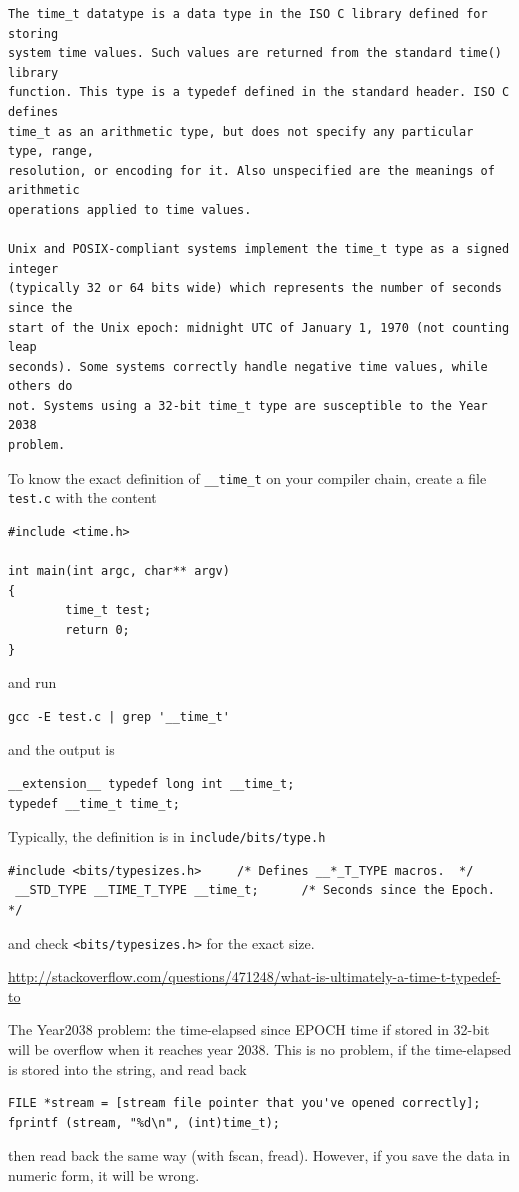 \begin{verbatim}
The time_t datatype is a data type in the ISO C library defined for storing
system time values. Such values are returned from the standard time() library
function. This type is a typedef defined in the standard header. ISO C defines
time_t as an arithmetic type, but does not specify any particular type, range,
resolution, or encoding for it. Also unspecified are the meanings of arithmetic
operations applied to time values.

Unix and POSIX-compliant systems implement the time_t type as a signed integer
(typically 32 or 64 bits wide) which represents the number of seconds since the
start of the Unix epoch: midnight UTC of January 1, 1970 (not counting leap
seconds). Some systems correctly handle negative time values, while others do
not. Systems using a 32-bit time_t type are susceptible to the Year 2038
problem. 
\end{verbatim}
 To know the exact definition of \verb!__time_t! on your compiler chain, create
 a file \verb!test.c! with the content
\begin{verbatim}
#include <time.h>

int main(int argc, char** argv)
{
        time_t test;
        return 0;
}
\end{verbatim}
and run
\begin{verbatim}
gcc -E test.c | grep '__time_t'
\end{verbatim}
and the output is
\begin{verbatim}
__extension__ typedef long int __time_t;
typedef __time_t time_t;

\end{verbatim}
Typically, the definition is in \verb!include/bits/type.h!
\begin{verbatim}
#include <bits/typesizes.h>     /* Defines __*_T_TYPE macros.  */
 __STD_TYPE __TIME_T_TYPE __time_t;      /* Seconds since the Epoch.  */
\end{verbatim}
and check \verb!<bits/typesizes.h>! for the exact size.

\url{http://stackoverflow.com/questions/471248/what-is-ultimately-a-time-t-typedef-to}
% 


The Year2038 problem: the time-elapsed since EPOCH time if stored in 32-bit will
be overflow when it reaches year 2038. This is no problem, if the time-elapsed
is stored into the string, and read back
\begin{verbatim}
FILE *stream = [stream file pointer that you've opened correctly];
fprintf (stream, "%d\n", (int)time_t);
\end{verbatim}
then read back the same way (with fscan, fread). However, if you save the data
in numeric form, it will be wrong.

